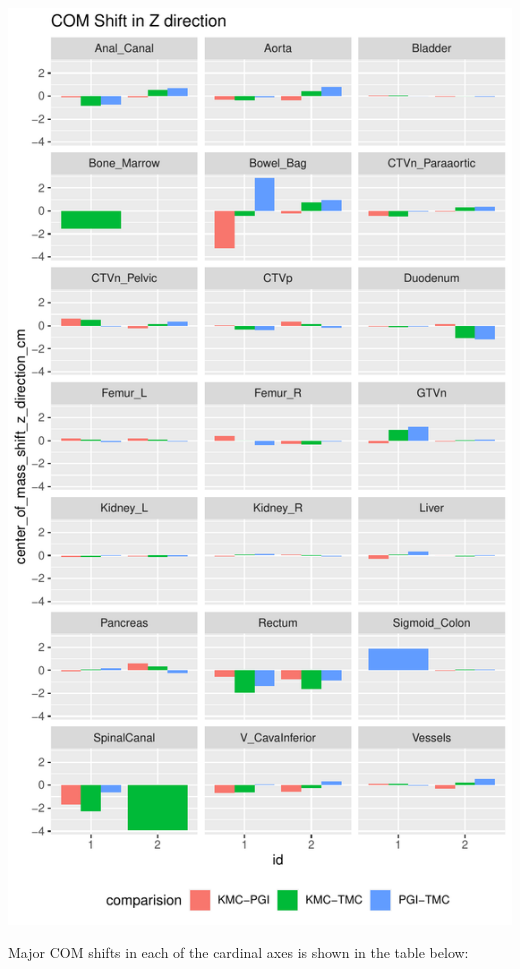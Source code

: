 \documentclass[
  letterpaper,
  DIV=11,
  numbers=noendperiod]{scrartcl}
\begin{document}
\includegraphics{analysis_files/figure-pdf/unnamed-chunk-10-1.pdf}

Major COM shifts in each of the cardinal axes is shown in the table
below:
\end{document}
